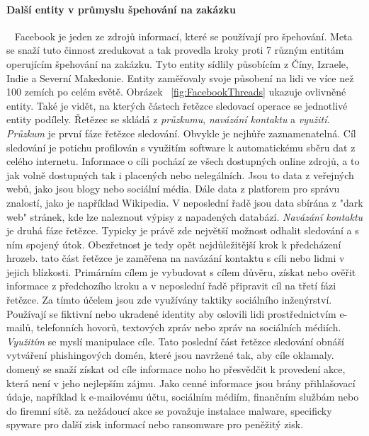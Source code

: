 \paragraph{Další entity v průmyslu špehování na zakázku}
~\label{fig:FacebookThreads}
Facebook je jeden ze zdrojů informací, které se používají pro špehování.
Meta se snaží tuto činnost zredukovat a tak provedla kroky proti 7 různým entitám operujícím špehování na zakázku.
Tyto entity sídlily působícím z Číny, Izraele, Indie a Severní Makedonie.
Entity zaměřovaly svoje působení na lidi ve více než 100 zemích po celém světě.
Obrázek ~\ref{fig:FacebookThreads} ukazuje ovlivněné entity.
Také je vidět, na kterých částech řetězce sledovací operace se jednotlivé entity podílely.
Řetězec se skládá z \textit{průzkumu}, \textit{navázání kontaktu} a \textit{využití}.
\textit{Průzkum} je první fáze řetězce sledování.
Obvykle je nejhůře zaznamenatelná.
Cíl sledování je potichu profilován s využitím software k automatickému sběru dat z celého internetu.
Informace o cíli pochází ze všech dostupných online zdrojů, a to jak volně dostupných tak i placených nebo nelegálních.
Jsou to data z veřejných webů, jako jsou blogy nebo sociální média.
Dále data z platforem pro správu znalostí, jako je například Wikipedia.
V neposlední řadě jsou data sbírána z "dark web" stránek, kde lze naleznout výpisy z napadených databází.
\textit{Navázání kontaktu} je druhá fáze řetězce.
Typicky je právě zde největší možnost odhalit sledování a s ním spojený útok.
Obezřetnost je tedy opět nejdůležitější krok k předcházení hrozeb.
tato část řetězce je zaměřena na navázání kontaktu s cíli nebo lidmi v jejich blízkosti.
Primárním cílem je vybudovat s cílem důvěru, získat nebo ověřit informace z předchozího kroku a v neposlední řadě připravit cíl na třetí fázi řetězce.
Za tímto účelem jsou zde využívány taktiky sociálního inženýrství.
Používají se fiktivní nebo ukradené identity aby oslovili lidi prostřednictvím e-mailů, telefonních hovorů, textových zpráv nebo zpráv na sociálních médiích.
\textit{Využitím} se myslí manipulace cíle.
Tato poslední část řetězce sledování obnáší vytváření phishingových domén, které jsou navržené tak, aby cíle oklamaly.
domený se snaží získat od cíle informace noho ho přesvědčit k provedení akce, která není v jeho nejlepším zájmu.
Jako cenné informace jsou brány přihlašovací údaje, například k  e-mailovému účtu, sociálním médiím, finančním službám nebo do  firemní sítě.
za nežádoucí akce se považuje instalace malware, specificky spyware pro další zisk informací nebo ransomware pro peněžitý zisk.\cite{pegasus_facebook}

